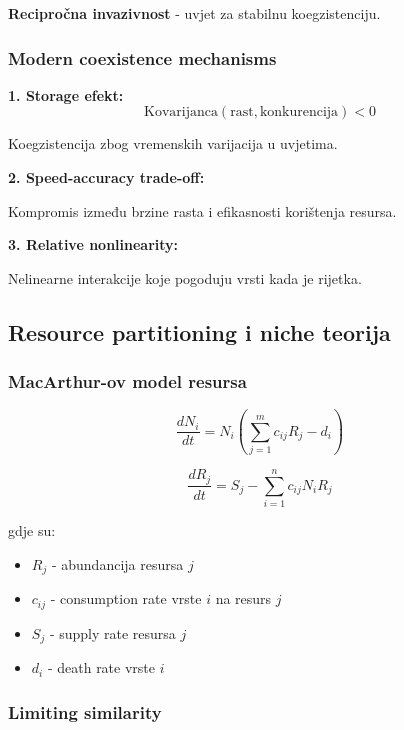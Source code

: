 \documentclass[11pt,oneside]{book}
\begin{document}
\textbf{Recipročna invazivnost} - uvjet za stabilnu koegzistenciju.

\subsubsection{Modern coexistence mechanisms}

\textbf{1. Storage efekt:}
\begin{equation}
	\text{Kovarijanca}(\text{rast}, \text{konkurencija}) < 0
\end{equation}

Koegzistencija zbog vremenskih varijacija u uvjetima.

\textbf{2. Speed-accuracy trade-off:}

Kompromis između brzine rasta i efikasnosti korištenja resursa.

\textbf{3. Relative nonlinearity:}

Nelinearne interakcije koje pogoduju vrsti kada je rijetka.

\subsection{Resource partitioning i niche teorija}

\subsubsection{MacArthur-ov model resursa}

\begin{equation}
	\frac{dN_i}{dt} = N_i \left(\sum_{j=1}^{m} c_{ij} R_j - d_i\right)
\end{equation}

\begin{equation}
	\frac{dR_j}{dt} = S_j - \sum_{i=1}^{n} c_{ij} N_i R_j
\end{equation}

gdje su:
\begin{itemize}
	\item $R_j$ - abundancija resursa $j$
	\item $c_{ij}$ - consumption rate vrste $i$ na resurs $j$
	\item $S_j$ - supply rate resursa $j$
	\item $d_i$ - death rate vrste $i$
\end{itemize}

\subsubsection{Limiting similarity}
\end{document}

